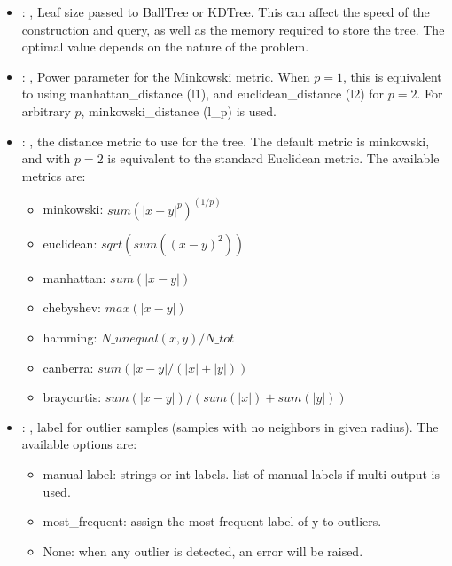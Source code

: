 \begin{itemize}
    \item {}: , 
      Leaf size passed to BallTree or KDTree. This can affect the speed of the construction
      and query, as well as the memory required to store the tree. The optimal value depends on the
      nature of the problem.

    \item {}: , 
      Power parameter for the Minkowski metric. When $p = 1$, this is equivalent to using
      manhattan\_distance (l1), and euclidean\_distance (l2) for $p = 2$. For arbitrary $p$,
      minkowski\_distance                                                  (l\_p) is used.

    \item {}: , 
      the distance metric to use for the tree. The default metric is minkowski, and with
      $p=2$ is equivalent to the standard Euclidean metric.
      The available metrics are:                                                  \begin{itemize}
      \item minkowski: $sum(|x - y|^p)^(1/p)$
      \item euclidean: $sqrt(sum((x - y)^2))$
      \item manhattan: $sum(|x - y|)$                                                    \item
      chebyshev: $max(|x - y|)$                                                    \item hamming:
      $N\_unequal(x, y) / N\_tot$                                                    \item canberra:
      $sum(|x - y| / (|x| + |y|))$                                                    \item
      braycurtis: $sum(|x - y|) / (sum(|x|) + sum(|y|))$
      \end{itemize}

    \item {}: , 
      label for outlier samples (samples with no neighbors in given radius).
      The available options are:                                                  \begin{itemize}
      \item manual label: strings or int labels. list of manual labels if multi-output is used.
      \item most\_frequent: assign the most frequent label of y to outliers.
      \item None: when any outlier is detected, an error will be raised.
      \end{itemize}
  \end{itemize}


